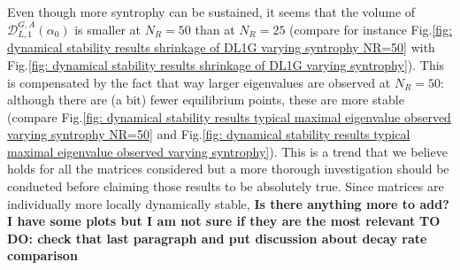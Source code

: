 \documentclass[12pt, titlepage]{report}
\begin{document}
Even though more syntrophy can be sustained, it seems that the volume of $\mathcal{D}_{L,1}^{G,A}(\alpha_0)$ is smaller at $N_R=50$ than at $N_R=25$ (compare for  instance Fig.\ref{fig: dynamical stability results shrinkage of DL1G varying syntrophy NR=50} with Fig.\ref{fig: dynamical stability results shrinkage of DL1G varying syntrophy}). This is compensated by the fact that way larger eigenvalues are observed at $N_R=50$: although there are (a bit) fewer equilibrium points, these are more stable (compare Fig.\ref{fig: dynamical stability results typical maximal eigenvalue observed varying syntrophy NR=50} and Fig.\ref{fig: dynamical stability results typical maximal eigenvalue observed varying syntrophy}). This is a trend that we believe holds for all the matrices considered but a more thorough investigation should be conducted before claiming those results to be absolutely true. Since matrices are individually more locally dynamically stable,  \textbf{Is there anything more to add? I have some plots but I am not sure if they are the most relevant} \textbf{TO DO: check that last paragraph and put discussion about decay rate comparison}

\FloatBarrier

\end{document}
